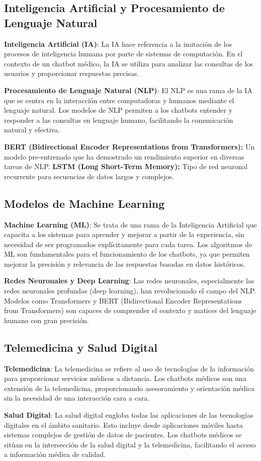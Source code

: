 
\subsection{Inteligencia Artificial y Procesamiento de Lenguaje Natural}

\textbf{Inteligencia Artificial (IA)}: La IA hace referencia a la imitación de los procesos de inteligencia humana por parte de sistemas de computación. En el contexto de un chatbot médico, la IA se utiliza para analizar las consultas de los usuarios y proporcionar respuestas precisas.

\textbf{Procesamiento de Lenguaje Natural (NLP)}: El NLP es una rama de la IA que se centra en la interacción entre computadoras y humanos mediante el lenguaje natural. Los modelos de NLP permiten a los chatbots entender y responder a las consultas en lenguaje humano, facilitando la comunicación natural y efectiva.

\subitem \textbf {BERT (Bidirectional Encoder Representations from Transformers):} Un modelo pre-entrenado que ha demostrado un rendimiento superior en diversas tareas de NLP.
\subitem \textbf {LSTM (Long Short-Term Memory):} Tipo de red neuronal recurrente para secuencias de datos largos y complejos.

\subsection{Modelos de Machine Learning}

\textbf{Machine Learning (ML)}: Se trata de una rama de la Inteligencia Artificial que capacita a los sistemas para aprender y mejorar a partir de la experiencia, sin necesidad de ser programados explícitamente para cada tarea. Los algoritmos de ML son fundamentales para el funcionamiento de los chatbots, ya que permiten mejorar la precisión y relevancia de las respuestas basadas en datos históricos.

\textbf{Redes Neuronales y Deep Learning}: Las redes neuronales, especialmente las redes neuronales profundas (deep learning), han revolucionado el campo del NLP. Modelos como Transformers y BERT (Bidirectional Encoder Representations from Transformers) son capaces de comprender el contexto y matices del lenguaje humano con gran precisión.

\subsection{Telemedicina y Salud Digital}

\textbf{Telemedicina}: La telemedicina se refiere al uso de tecnologías de la información para proporcionar servicios médicos a distancia. Los chatbots médicos son una extensión de la telemedicina, proporcionando asesoramiento y orientación médica sin la necesidad de una interacción cara a cara.

\textbf{Salud Digital}: La salud digital engloba todas las aplicaciones de las tecnologías digitales en el ámbito sanitario. Esto incluye desde aplicaciones móviles hasta sistemas complejos de gestión de datos de pacientes. Los chatbots médicos se sitúan en la intersección de la salud digital y la telemedicina, facilitando el acceso a información médica de calidad.